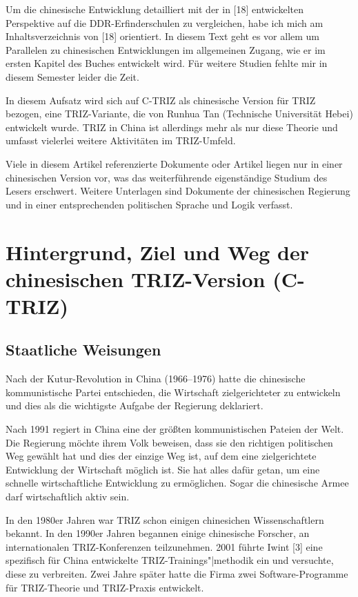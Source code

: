 \documentclass[11pt,a4paper]{article}
\begin{document}
Um die chinesische Entwicklung detailliert mit der in [18] entwickelten
Perspektive auf die DDR-Erfinderschulen zu vergleichen, habe ich mich am
Inhaltsverzeichnis von [18] orientiert.  In diesem Text geht es vor allem um
Parallelen zu chinesischen Entwicklungen im allgemeinen Zugang, wie er im
ersten Kapitel des Buches entwickelt wird.  Für weitere Studien fehlte mir
in diesem Semester leider die Zeit.

In diesem Aufsatz wird sich auf C-TRIZ als chinesische Version für TRIZ
bezogen, eine TRIZ-Variante, die von Runhua Tan (Technische Universität Hebei)
entwickelt wurde. TRIZ in China ist allerdings mehr als nur diese Theorie und
umfasst vielerlei weitere Aktivitäten im TRIZ-Umfeld. 

Viele in diesem Artikel referenzierte Dokumente oder Artikel liegen nur in
einer chinesischen Version vor, was das weiterführende eigenständige Studium
des Lesers erschwert. Weitere Unterlagen sind Dokumente der chinesischen
Regierung und in einer entsprechenden politischen Sprache und Logik verfasst.

\section{Hintergrund, Ziel und Weg der chinesischen TRIZ-Version (C-TRIZ)}

\subsection{Staatliche Weisungen}
Nach der Kutur-Revolution in China (1966--1976) hatte die chinesische
kommunistische Partei entschieden, die Wirtschaft zielgerichteter zu
entwickeln und dies als die wichtigste Aufgabe der Regierung deklariert.

Nach 1991 regiert in China eine der größten kommunistischen Pateien der Welt.
Die Regierung möchte ihrem Volk beweisen, dass sie den richtigen politischen
Weg gewählt hat und dies der einzige Weg ist, auf dem eine zielgerichtete
Entwicklung der Wirtschaft möglich ist. Sie hat alles dafür getan, um eine
schnelle wirtschaftliche Entwicklung zu ermöglichen. Sogar die chinesische
Armee darf wirtschaftlich aktiv sein.

In den 1980er Jahren war TRIZ schon einigen chinesichen Wissenschaftlern
bekannt.  In den 1990er Jahren begannen einige chinesische Forscher, an
internationalen TRIZ-Konferenzen teilzunehmen. 2001 führte Iwint [3] eine
spezifisch für China entwickelte TRIZ-Trainings"|methodik ein und versuchte,
diese zu verbreiten. Zwei Jahre später hatte die Firma zwei Software-Programme
für TRIZ-Theorie und TRIZ-Praxis entwickelt.
\end{document}
